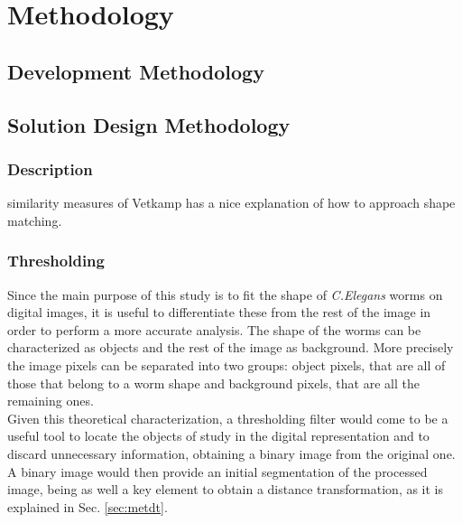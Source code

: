 \cleardoublepage  
\chapter{Methodology}
\label{chap:methodology}

\section{Development Methodology}
\label{sec:devmet}

\section{Solution Design Methodology}
\label{sec:solmet}

\subsection{Description}

similarity measures of Vetkamp has a nice explanation 
of how to approach shape matching.

\subsection{Thresholding}
\label{sec:metthres}

Since the main purpose of this study is to fit the shape of \emph{C.Elegans} worms on digital
images, it is useful to differentiate these from the rest of the image in order to perform a more 
accurate analysis. The shape of the worms
can be characterized as objects and the rest of the image as background. More precisely
the image pixels can be separated into two groups: object pixels, that are all of those
that belong to a worm shape and background pixels, that are all the remaining ones.\\

Given this theoretical characterization, a thresholding filter would come to be a useful tool 
to locate the objects of study in the digital representation and to discard unnecessary 
information, obtaining a binary image from the original one. A binary image would then provide
an initial segmentation of the processed image, being as well a key element to obtain
a distance transformation, as it is explained in Sec. \ref{sec:metdt}.

